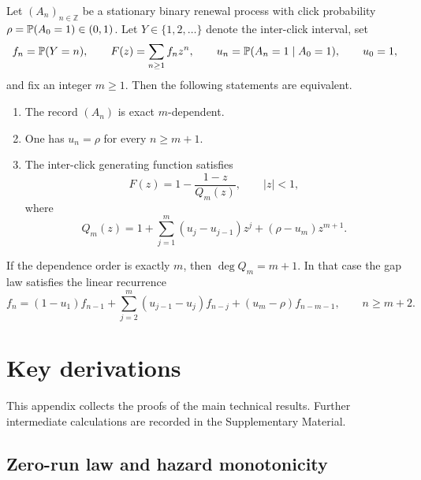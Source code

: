 \begin{theorem}\label{thm:renewal-md-main}
Let $(A_n)_{n\in\mathbb Z}$ be a stationary binary renewal process with click probability $\rho=\mathbb{P}(A_0=1)\in(0,1)$. Let $Y\in\{1,2,\dots\}$ denote the inter-click interval, set
\[
f_n=\mathbb{P}(Y=n),
\qquad
F(z)=\sum_{n\ge1}f_n z^n,
\qquad
u_n=\mathbb{P}(A_n=1\mid A_0=1),
\qquad
u_0=1,
\]
and fix an integer $m\ge1$. Then the following statements are equivalent.
\begin{enumerate}[label=\textup{(\roman*)},leftmargin=2.2em,itemsep=0.25em]
\item The record $(A_n)$ is exact $m$-dependent.
\item One has $u_n=\rho$ for every $n\ge m+1$.
\item The inter-click generating function satisfies
\begin{equation}\label{eq:renewal-q-main}
F(z)=1-\frac{1-z}{Q_m(z)},
\qquad |z|<1,
\end{equation}
where
\begin{equation}\label{eq:renewal-poly-main}
Q_m(z)=1+\sum_{j=1}^{m}(u_j-u_{j-1})z^j+(\rho-u_m)z^{m+1}.
\end{equation}
\end{enumerate}
If the dependence order is exactly $m$, then $\deg Q_m=m+1$. In that case the gap law satisfies the linear recurrence
\begin{equation}\label{eq:renewal-rec-main}
f_n=
(1-u_1)f_{n-1}
+\sum_{j=2}^{m}(u_{j-1}-u_j)f_{n-j}
+(u_m-\rho)f_{n-m-1},
\qquad n\ge m+2.
\end{equation}
\end{theorem}

\section{Key derivations}\label{app:derivations}

This appendix collects the proofs of the main technical results. Further intermediate calculations are recorded in the Supplementary Material.

\subsection{Zero-run law and hazard monotonicity}

